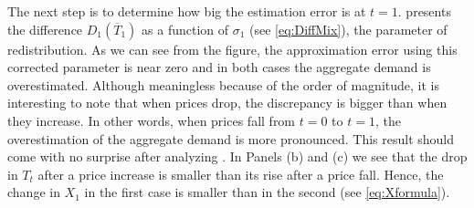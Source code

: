 \documentclass[english, a4paper, 12pt]{article}
\begin{document}
The next step is to determine how big the estimation error is at $t = 1$.  presents the difference $D_{1}(\overline{T}_{1})$ as a function of $\sigma_{1}$ (see \eqref{eq:DiffMix}), the parameter of redistribution. As we can see from the figure, the approximation error using this corrected parameter is near zero and in both cases the aggregate demand is overestimated. Although meaningless because of the order of magnitude, it is interesting to note that when prices drop, the discrepancy is bigger than when they increase. In other words, when prices fall from $t=0$ to $t = 1$, the overestimation of the aggregate demand is more pronounced. This result should come with no surprise after analyzing . In Panels (b) and (c) we see that the drop in $T_{t}$ after a price increase is smaller than its rise after a price fall. Hence, the change in $X_{1}$ in the first case is smaller than in the second (see \eqref{eq:Xformula}). 
\vfill
\end{document}
